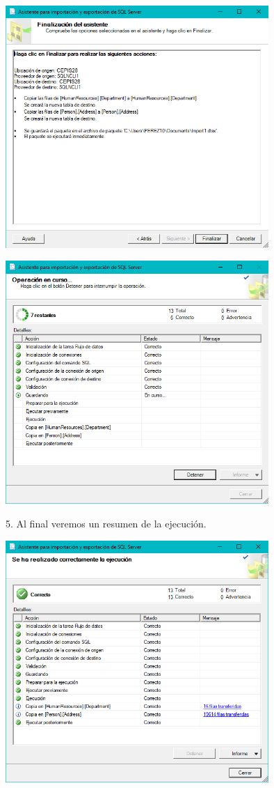 	\begin{center}
	\includegraphics[width=10cm]{imagenes/img10}
    \end{center}	
    
	\begin{center}
	\includegraphics[width=10cm]{imagenes/img11}
    \end{center}	
    
5. Al final veremos un resumen de la ejecución.
	\begin{center}
	\includegraphics[width=10cm]{imagenes/img12}
	\end{center}	